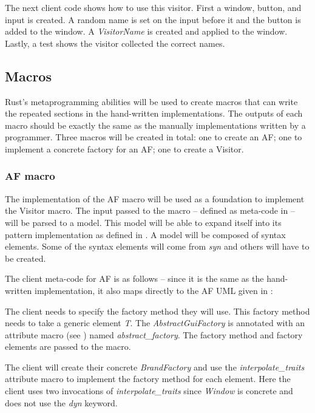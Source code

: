 The next client code shows how to use this visitor.
First a window, button, and input is created.
A random name is set on the input before it and the button is added to the window.
A \textit{VisitorName} is created and applied to the window.
Lastly, a test shows the visitor collected the correct names.


\subsection{Macros}
Rust's metaprogramming abilities will be used to create macros that can write the repeated sections in the hand-written implementations.
The outputs of each macro should be exactly the same as the manually implementations written by a programmer.
Three macros will be created in total: one to create an AF; one to implement a concrete factory for an AF; one to create a Visitor.

\subsubsection{AF macro}
The implementation of the AF macro will be used as a foundation to implement the Visitor macro.
The input passed to the macro -- defined as meta-code in  -- will be parsed to a model.
This model will be able to expand itself into its pattern implementation as defined in .
A model will be composed of syntax elements.
Some of the syntax elements will come from \textit{syn} and others will have to be created.

The client meta-code for AF is as follows -- since it is the same as the hand-written implementation, it also maps directly to the AF UML given in :


The client needs to specify the factory method they will use.
This factory method needs to take a generic element \textit{T}.
The \textit{AbstractGuiFactory} is annotated with an attribute macro (see ) named \textit{abstract\_factory}.
The factory method and factory elements are passed to the macro.

The client will create their concrete \textit{BrandFactory} and use the \textit{interpolate\_traits} attribute macro to implement the factory method for each element.
Here the client uses two invocations of \textit{interpolate\_traits} since \textit{Window} is concrete and does not use the \textit{dyn} keyword.

